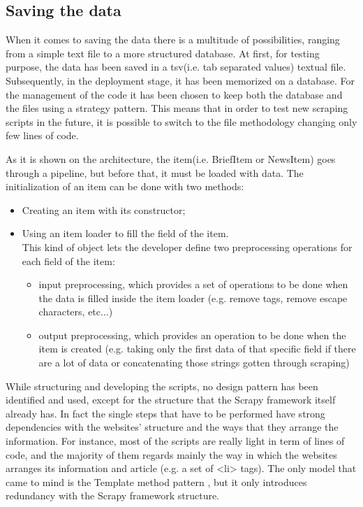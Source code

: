 \subsection{Saving the data}
When it comes to saving the data there is a multitude of possibilities, ranging from a simple text file to a more structured database. 
At first, for testing purpose, the data has been saved in a tsv(i.e. tab separated values) textual file. Subsequently, in the deployment stage, it has been memorized on a database. For the management of the code it has been chosen to keep both the database and the files using a strategy pattern. This means that in order to test new scraping scripts in the future, it is possible to switch to the file methodology changing only few lines of code. 
\par
As it is shown on the architecture, the item(i.e. BriefItem or NewsItem) goes through a pipeline, but before that, it must be loaded with data.
The initialization of an item can be done with two methods:
\begin{itemize}
	\item Creating an item with its constructor;
	\item Using an item loader to fill the field of the item.\\
	This kind of object lets the developer define two preprocessing operations for each field of the item:
	\begin{itemize}
		\item input preprocessing, which provides a set of operations to be done when the data is filled inside the item loader (e.g. remove tags, remove escape characters, etc...)
		\item output preprocessing, which provides an operation to be done when the item is created (e.g. taking only the first data of that specific field if there are a lot of data or concatenating those strings gotten through scraping)
	\end{itemize}
\end{itemize}

\par While structuring and developing the scripts, no design pattern has been identified and used, except for the structure that the Scrapy framework itself already has. In fact the single steps that have to be performed have strong dependencies with  the websites' structure and the ways that they arrange the information. For instance, most of the scripts are really light in term of lines of code, and the majority of them regards mainly the way in which the websites arranges its information and article (e.g. a set of <li> tags). The only model that came to mind is the Template method pattern \cite{templatepattern}, but it only introduces redundancy with the Scrapy framework structure. 


